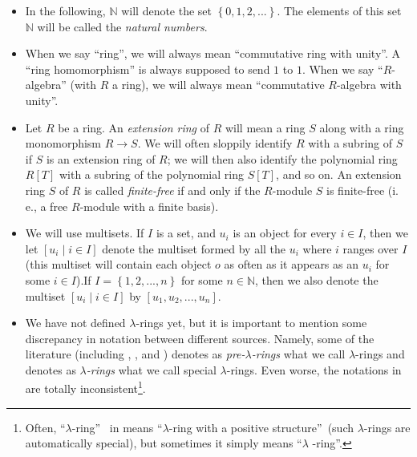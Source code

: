 \documentclass[numbers=enddot,12pt,final,onecolumn,notitlepage]{scrartcl}%
\begin{document}
\begin{itemize}
\item In the following, $\mathbb{N}$ will denote the set $\left\{
0,1,2,...\right\}  $. The elements of this set $\mathbb{N}$ will be called the
\textit{natural numbers}.

\item When we say ``ring'', we will always mean ``commutative ring with
unity''. A ``ring homomorphism'' is always supposed to send $1$ to $1$. When
we say ``$R$-algebra'' (with $R$ a ring), we will always mean ``commutative
$R$-algebra with unity''.

\item Let $R$ be a ring. An \textit{extension ring} of $R$ will mean a ring
$S$ along with a ring monomorphism $R\rightarrow S$. We will often sloppily
identify $R$ with a subring of $S$ if $S$ is an extension ring of $R$; we will
then also identify the polynomial ring $R\left[  T\right]  $ with a subring of
the polynomial ring $S\left[  T\right]  $, and so on. An extension ring $S$ of
$R$ is called \textit{finite-free} if and only if the $R$-module $S$ is
finite-free (i. e., a free $R$-module with a finite basis).

\item We will use multisets. If $I$ is a set, and $u_{i}$ is an object for
every $i\in I$, then we let $\left[  u_{i}\mid i\in I\right]  $ denote the
multiset formed by all the $u_{i}$ where $i$ ranges over $I$ (this multiset
will contain each object $o$ as often as it appears as an $u_{i}$ for some
$i\in I$).\newline If $I=\left\{  1,2,...,n\right\}  $ for some $n\in
\mathbb{N}$, then we also denote the multiset $\left[  u_{i}\mid i\in
I\right]  $ by $\left[  u_{1},u_{2},...,u_{n}\right]  $.

\item We have not defined $\lambda$-rings yet, but it is important to mention
some discrepancy in notation between different sources. Namely, some of the
literature (including \cite{Knut73}, \cite{Hazewi08a}, \cite{Hazewi08b} and
\cite{Yau10}) denotes as \textit{pre-}$\lambda$\textit{-rings} what we call
$\lambda$-rings and denotes as $\lambda$\textit{-rings} what we call special
$\lambda$-rings. Even worse, the notations in \cite{FulLan85} are totally
inconsistent\footnote{Often, \textquotedblleft$\lambda$-ring\textquotedblright%
\ in \cite{FulLan85} means \textquotedblleft$\lambda$-ring with a positive
structure\textquotedblright\ (such $\lambda$-rings are automatically special),
but sometimes it simply means \textquotedblleft$\lambda$%
-ring\textquotedblright.}.


\end{itemize}
\end{document}
